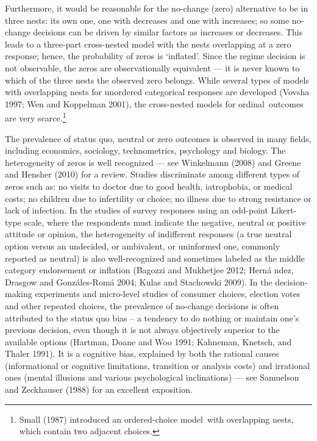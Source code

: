 \documentclass[letterpaper,fleqn,12pt]{article}
\begin{document}
\begin{onehalfspace}%

Furthermore, it would be reasonable for the no-change (zero) alternative to
be in three nests: its own one, one with decreases and one with increases;
so some no-change decisions can be driven by similar factors as increases or
decreases. This leads to a three-part cross-nested model with the nests
overlapping at a zero response; hence, the probability of zeros is
`inflated'. Since the regime decision is not observable, the zeros are
observationally equivalent --- it is never known to which of the three nests
the observed zero belongs. While several types of models with overlapping
nests for unordered categorical responses are developed (Vovsha 1997; Wen
and Koppelman 2001), the cross-nested models for ordinal\ outcomes are very
scarce.\footnote{%
Small (1987) introduced an ordered-choice model\ with overlapping nests,
which contain two adjacent choices.}

The prevalence of status quo, neutral or zero outcomes is observed in many
fields, including economics, sociology, technometrics, psychology and
biology. The heterogeneity of zeros is well recognized --- see Winkelmann
(2008) and Greene and Hensher (2010) for a review. Studies discriminate
among different types of zeros such as: no visits to doctor due to good
health, iatrophobia, or medical costs; no children due to infertility or
choice; no illness due to strong resistance or lack of infection. In the
studies of survey responses using an odd-point Likert-type scale, where the
respondents must indicate the negative, neutral or positive attitude or
opinion, the heterogeneity of indifferent responses (a true neutral option
versus an undecided, or ambivalent, or uninformed one, commonly reported as
neutral) is also well-recognized and sometimes labeled as the middle
category endorsement or inflation (Bagozzi and Mukhetjee 2012; Hern\'{a}%
ndez, Drasgow and Gonz\'{a}les-Rom\'{a} 2004; Kulas and Stachowski 2009). In
the decision-making experiments and micro-level studies of consumer choices,
election votes and other repeated choices, the prevalence of no-change
decisions is often attributed to the status quo bias -- a tendency to do
nothing or maintain one's previous decision, even though it is not always
objectively superior to the available options (Hartman, Doane and Woo 1991;
Kahneman, Knetsch, and Thaler 1991). It is a cognitive bias, explained by
both the rational causes (informational or cognitive limitations, transition
or analysis costs) and irrational ones (mental illusions and various
psychological inclinations) --- see Samuelson and Zeckhauser (1988) for an
excellent exposition.


\end{onehalfspace}
\end{document}

